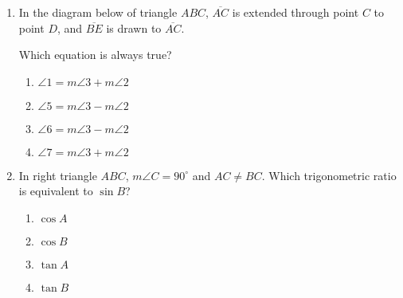 \documentclass[12pt, oneside]{article}
\begin{document}
\begin{enumerate}[itemsep=0.5cm]
\item In the diagram below of triangle $ABC$, $\overline{AC}$ is extended through point $C$ to point $D$, and $\overline{BE}$ is drawn to $\overline{AC}$.
  \begin{center}
  \end{center}
Which equation is always true?
\begin{multicols}{2}
  \begin{enumerate}
    \item $\angle 1 = m\angle 3 + m\angle 2$
    \item $\angle 5 = m\angle 3 - m\angle 2$ 
    \item $\angle 6 = m\angle 3 - m\angle 2$
    \item $\angle 7 = m\angle 3 + m\angle 2$
  \end{enumerate}
\end{multicols}

\newpage
\item In right triangle $ABC$, $m\angle C=90^\circ$ and $AC \ne BC$. Which trigonometric ratio is equivalent to $\sin B$?
\begin{multicols}{2}
  \begin{enumerate}
    \item $\cos A$
    \item $\cos B$
    \item $\tan A$
    \item $\tan B$
  \end{enumerate}
\end{multicols}


\end{enumerate}
\end{document}
